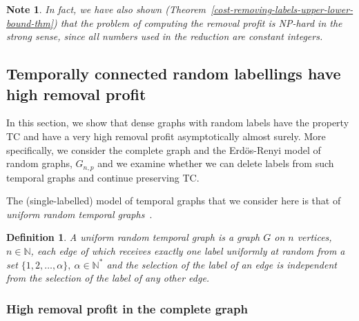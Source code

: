 \documentclass[a4paper,UKenglish]{article}
\newtheorem{definition}{Definition}
\newtheorem*{note*}{Note}
\begin{document}
\begin{note*}
In fact, we have also shown (Theorem~\ref{cost-removing-labels-upper-lower-bound-thm}) that the problem of computing the removal profit is NP-hard in the strong sense, since all numbers used in the reduction are constant integers.
\end{note*}





\subsection{Temporally connected random labellings have high removal profit}\label{sec:random_labels_minimal}

In this section, we show that dense graphs with random labels have the property TC and have a very high removal profit asymptotically almost surely.
More specifically, we consider the complete graph and the Erd\"os-Renyi model of random graphs, $G_{n,p}$ and we examine whether we can delete labels from such temporal graphs and continue preserving TC.

The (single-labelled) model of temporal graphs that we consider here is that of \emph{uniform random temporal graphs}~\cite{akrida-jpdc}.
\begin{definition}\label{def:random}\hspace{-0,01cm}\protect\cite{akrida-jpdc}
A \emph{uniform random temporal graph} is a graph $G$ on $n$ vertices, $n \in \mathbb{N}$, each edge of which receives exactly one label uniformly at random from a set $\{1,2,\ldots, \alpha\},~\alpha \in \mathbb{N}^*$ and the selection of the label of an edge is independent from the selection of the label of any other edge.
\end{definition}


\subsubsection{High removal profit in the complete graph}
\end{document}
